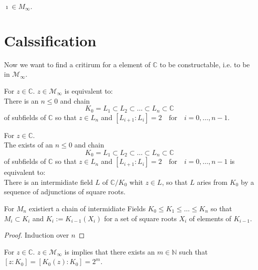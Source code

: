 \begin{lemma}
    \label{construction_imath}
    $\imath \in M_{\infty}$.
\end{lemma}

\section{Calssification}
Now we want to find a critirum for a element of $\mathbb{C}$ to be constructable, i.e. to be in $\mathcal{M}_{\infty}$.

\begin{theorem}
    \label{thm:Z_in_Minf_imp}
    For $z \in \mathbb{C}$. $z \in \mathcal{M}_{\infty}$ is equivalent to:\\
    There is an $n\le 0$ and chain 
    $$K_0 = L_1 \subset L_2 \subset \ldots \subset L_n \subset \mathbb{C}$$
    of subfields of $\mathbb{C}$ so that $z \in L_n$ and 
    $ [L_{i+1}:L_i] = 2 \quad \text{for} \quad i = 0, \ldots, n-1$.
\end{theorem}

\begin{lemma}
    \label{lem:Z_in_Minf_imp_eq} 
    For $z \in \mathbb{C}$. \\
    The exists of an $n\le 0$ and chain 
    $$K_0 = L_1 \subset L_2 \subset \ldots \subset L_n \subset \mathbb{C}$$
    of subfields of $\mathbb{C}$ so that $z \in L_n$ and 
    $ [L_{i+1}:L_i] = 2 \quad \text{for} \quad i = 0, \ldots, n-1$ is equivalent to:\\
    There is an intermidiate field $L$ of $\mathbb{C}/K_0$ whit $z \in L$, so that $L$ aries from $K_0$ by a sequence of adjunctions of square roots.
\end{lemma}

\begin{lemma}
    \label{lem:Mi_chain}
    For $M_n$ existiert a chain of intermidiate Fields $K_0 \le K_1 \le \ldots \le K_n$ so that $M_i\subset K_i$ and $K_i:= K_{i-1}(X_i)$ for a set of square roots $X_i$ of elements of $K_{i-1}$.
\end{lemma}

\begin{proof}
Induction over $n$

\end{proof}

\begin{lemma} 
    \label{lem:Z_in_Minf_imp_eq2}
    For $z \in \mathbb{C}$. $z \in \mathcal{M}_{\infty}$ is implies that there exists an $m \in \mathbb{N}$ such that $[z:K_0] = [K_0(z):K_0]= 2^m$.
\end{lemma}

